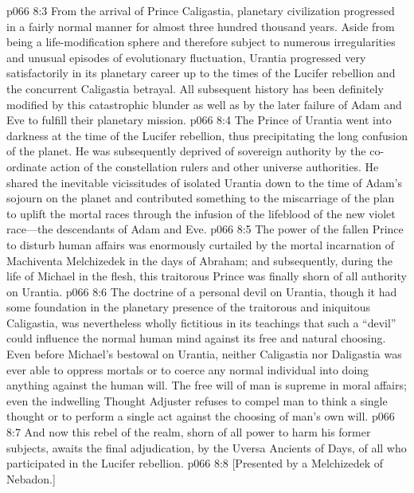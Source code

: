 \pc \vs p066 8:3 From the arrival of Prince Caligastia, planetary civilization progressed in a fairly normal manner for almost three hundred thousand years. Aside from being a life\hyp{}modification sphere and therefore subject to numerous irregularities and unusual episodes of evolutionary fluctuation, Urantia progressed very satisfactorily in its planetary career up to the times of the Lucifer rebellion and the concurrent Caligastia betrayal. All subsequent history has been definitely modified by this catastrophic blunder as well as by the later failure of Adam and Eve to fulfill their planetary mission.
\vs p066 8:4 The Prince of Urantia went into darkness at the time of the Lucifer rebellion, thus precipitating the long confusion of the planet. He was subsequently deprived of sovereign authority by the co\hyp{}ordinate action of the constellation rulers and other universe authorities. He shared the inevitable vicissitudes of isolated Urantia down to the time of Adam’s sojourn on the planet and contributed something to the miscarriage of the plan to uplift the mortal races through the infusion of the lifeblood of the new violet race---the descendants of Adam and Eve.\plusone
\vs p066 8:5 The power of the fallen Prince to disturb human affairs was enormously curtailed by the mortal incarnation of Machiventa Melchizedek in the days of Abraham; and subsequently, during the life of Michael in the flesh, this traitorous Prince was finally shorn of all authority on Urantia.
\pc \vs p066 8:6 The doctrine of a personal devil on Urantia, though it had some foundation in the planetary presence of the traitorous and iniquitous Caligastia, was nevertheless wholly fictitious in its teachings that such a “devil” could influence the normal human mind against its free and natural choosing. Even before Michael’s bestowal on Urantia, neither Caligastia nor Daligastia was ever able to oppress mortals or to coerce any normal individual into doing anything against the human will. The free will of man is supreme in moral affairs; even the indwelling Thought Adjuster refuses to compel man to think a single thought or to perform a single act against the choosing of man’s own will.
\vs p066 8:7 And now this rebel of the realm, shorn of all power to harm his former subjects, awaits the final adjudication, by the Uversa Ancients of Days, of all who participated in the Lucifer rebellion.
\vsetoff
\vs p066 8:8 [Presented by a Melchizedek of Nebadon.]
